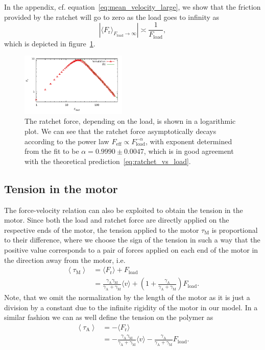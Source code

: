 \documentclass[aps,pre,twocolumn,showpacs,showkeys,superscriptaddress,floatfix]{revtex4-1}
\begin{document}
In the appendix, cf. equation~\eqref{eq:mean_velocity_large}, we show that the friction provided by the ratchet will go to zero as the load goes to infinity as 
\begin{equation}
\left| \langle F_\text{r} \rangle_{F_\text{load}\rightarrow\infty} \right| \asymp \frac{1}{F_\text{load}} , 
\label{eq:ratchet_vs_load}
\end{equation} 
which is depicted in figure~\ref{fig:ratchet_force_decay}. 
\begin{figure}[t]
\centering
\includegraphics[width=0.45\textwidth,height=!]{ratchet_force_decay}
\caption{
\label{fig:ratchet_force_decay}
The ratchet force, depending on the load, is shown in a logarithmic plot. 
We can see that the ratchet force asymptotically decays according to the power law $F_\text{eff} \propto F_\text{load}^{-\alpha}$, 
with exponent determined from the fit to be $\alpha = 0.9990 \pm 0.0047$, 
which is in good agreement with the theoretical prediction~\eqref{eq:ratchet_vs_load}.
}
\end{figure}


\subsection{Tension in the motor}
The force-velocity relation can also be exploited to obtain the tension in the motor. 
Since both the load and ratchet force are directly applied on the respective ends of the motor, 
the tension applied to the motor $\tau_\text{M}$ is proportional to their difference,
where we choose the sign of the tension in such a way 
that the positive value corresponds to a pair of forces applied on each end of the motor in the direction away from the motor,
i.e.  
\begin{align}
\left\langle \tau_\text{M} \right\rangle 
&= \langle F_\text{r} \rangle + F_\text{load} \nonumber \\
&= \frac{\gamma_\text{A}\gamma_\text{M}}{\gamma_\text{A}+\gamma_\text{M}}\langle v\rangle 
+ \left(1 + \frac{\gamma_\text{A}}{\gamma_\text{A}+\gamma_\text{M}} \right) F_\text{load}.
\label{eq:tension}
\end{align}
Note, that we omit the normalization by the length of the motor as it is just a division by a constant due to the infinite rigidity of the motor in our model.   
In a similar fashion we can as well define the tension on the polymer as
\begin{align}
\left\langle \tau_\text{A} \right\rangle 
&= - \langle F_\text{r} \rangle \nonumber \\
&= - \frac{\gamma_\text{A}\gamma_\text{M}}{\gamma_\text{A}+\gamma_\text{M}}\langle v\rangle 
- \frac{\gamma_\text{A}}{\gamma_\text{A}+\gamma_\text{M}} F_\text{load}.
\label{eq:tension_on_polymer}
\end{align}
\end{document}
